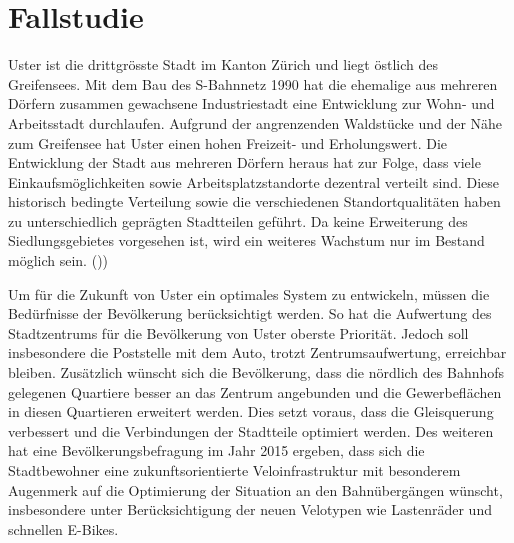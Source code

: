 %
%
%
%

 
\chapter{Fallstudie}
\label{chap:Fallstudie}

Uster ist die drittgrösste Stadt im Kanton Zürich und liegt östlich des Greifensees. Mit dem Bau des S-Bahnnetz 1990 hat die ehemalige aus mehreren Dörfern zusammen gewachsene Industriestadt eine Entwicklung zur Wohn- und Arbeitsstadt durchlaufen.
Aufgrund der angrenzenden Waldstücke und der Nähe zum Greifensee hat Uster einen hohen Freizeit- und Erholungswert.
Die Entwicklung der Stadt aus mehreren Dörfern heraus hat zur Folge, dass viele Einkaufsmöglichkeiten sowie Arbeitsplatzstandorte dezentral verteilt sind. Diese historisch bedingte Verteilung sowie die verschiedenen Standortqualitäten haben zu unterschiedlich geprägten Stadtteilen geführt. Da keine Erweiterung des Siedlungsgebietes vorgesehen ist, wird ein weiteres Wachstum nur im Bestand möglich sein. (\cite{STEK}))

Um für die Zukunft von Uster ein optimales System zu entwickeln, müssen die Bedürfnisse der Bevölkerung berücksichtigt werden. 
So hat die Aufwertung des Stadtzentrums für die Bevölkerung von Uster oberste Priorität. Jedoch soll insbesondere die Poststelle mit dem Auto, trotzt Zentrumsaufwertung, erreichbar bleiben. Zusätzlich wünscht sich die Bevölkerung, dass die nördlich des Bahnhofs gelegenen Quartiere besser an das Zentrum angebunden und die Gewerbeflächen in diesen Quartieren erweitert werden. Dies setzt voraus, dass die Gleisquerung verbessert und die Verbindungen der Stadtteile optimiert werden. Des weiteren hat eine Bevölkerungsbefragung im Jahr 2015 ergeben, dass sich die Stadtbewohner eine zukunftsorientierte Veloinfrastruktur mit besonderem Augenmerk auf die Optimierung der Situation an den Bahnübergängen wünscht, insbesondere unter Berücksichtigung der neuen Velotypen wie Lastenräder und schnellen E-Bikes.

